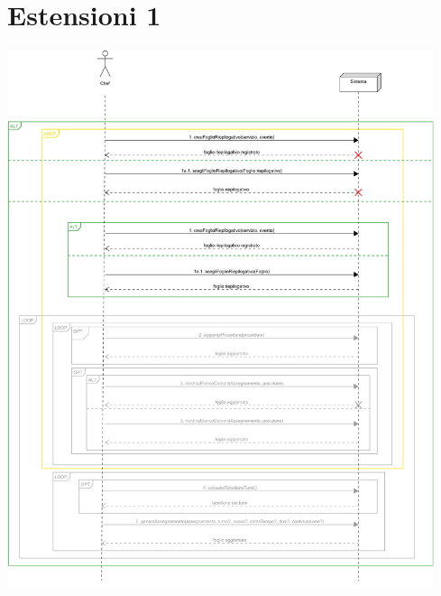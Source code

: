 \section*{Estensioni 1}
\includegraphics[max width=\textwidth, max height=158mm]{../resources/img/GCC/SSD/ext1.png}


